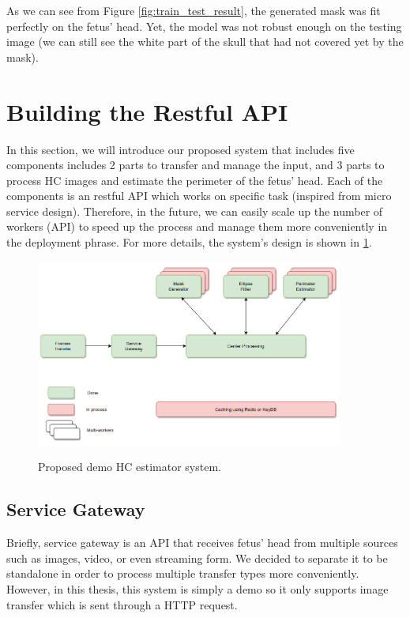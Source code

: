 	As we can see from Figure \ref{fig:train_test_result}, the generated mask was fit perfectly on the fetus' head. Yet, the model was not robust enough on the testing image (we can still see the white part of the skull that had not covered yet by the mask).
	
\section{Building the Restful API}
\noindent

	In this section, we will introduce our proposed system that includes five components includes 2 parts to transfer and manage the input, and 3 parts to process HC images and estimate the perimeter of the fetus' head. Each of the components is an restful API which works on specific task (inspired from micro service design). Therefore, in the future, we can easily scale up the number of workers (API) to speed up the process and manage them more conveniently in the deployment phrase. For more details, the system's design is shown in \ref{fig:hc_system}.
	
	\begin{figure}[H]
		\centering
		{\includegraphics[width=0.9\textwidth]{./hinhanh/chap6/hc_system.png}}
		\caption{Proposed demo HC estimator system.}
		\label{fig:hc_system}
	\end{figure}

\subsection{Service Gateway}
\noindent

	Briefly, service gateway is an API that receives fetus' head from multiple sources such as images, video, or even streaming form. We decided to separate it to be standalone in order to process multiple transfer types more conveniently. However, in this thesis, this system is simply a demo so it only supports image transfer which is sent through a HTTP request.
	
